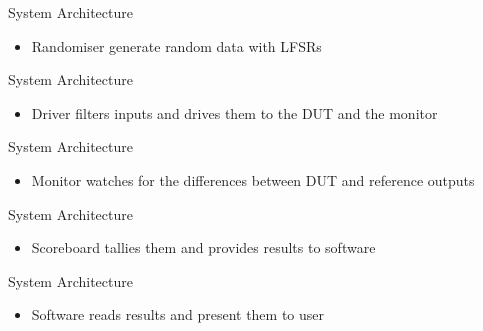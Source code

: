 \documentclass[t]{beamer}
\begin{document}
\begin{frame}{System Architecture}
  \begin{figure}[H]
    \centering
    \resizebox{0.8\textwidth}{!}{%
      
    }
  \end{figure}
  \begin{itemize}
    \item Randomiser generate random data with LFSRs
  \end{itemize}
\end{frame}

\begin{frame}{System Architecture}
  \begin{figure}[H]
    \centering
    \resizebox{0.8\textwidth}{!}{%
      
    }
  \end{figure}
  \begin{itemize}
    \item Driver filters inputs and drives them to the DUT and the monitor
  \end{itemize}
\end{frame}

\begin{frame}{System Architecture}
  \begin{figure}[H]
    \centering
    \resizebox{0.8\textwidth}{!}{%
      
    }
  \end{figure}
  \begin{itemize}
    \item Monitor watches for the differences between DUT and reference outputs
  \end{itemize}
\end{frame}

\begin{frame}{System Architecture}
  \begin{figure}[H]
    \centering
    \resizebox{0.8\textwidth}{!}{%
      
    }
  \end{figure}
  \begin{itemize}
    \item Scoreboard tallies them and provides results to software
  \end{itemize}
\end{frame}

\begin{frame}{System Architecture}
  \begin{figure}[H]
    \centering
    \resizebox{0.8\textwidth}{!}{%
      
    }
  \end{figure}
  \begin{itemize}
    \item Software reads results and present them to user
  \end{itemize}
\end{frame}
\end{document}

